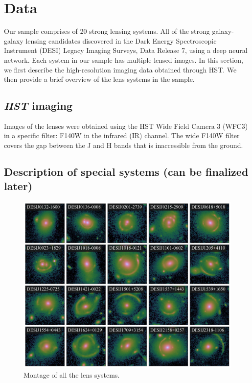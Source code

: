 \documentclass{aa}
\begin{document}
\section{Data} \label{sec:data}
Our sample comprises of 20 strong lensing systems. All of the strong galaxy-galaxy lensing candidates discovered in the Dark Energy Spectroscopic Instrument (DESI) Legacy Imaging Surveys, Data Release 7, using a deep neural network. Each system in our sample has multiple lensed images. In this section, we first describe the high-resolution imaging data obtained through HST. We then provide a brief overview of the lens systems in the sample.


\subsection{\textit{HST} imaging} 

Images of the lenses were obtained using the HST Wide Field Camera 3 (WFC3) in a specific filter: F140W in the infrared (IR) channel. The wide F140W filter covers the gap between the J and H bands that is inaccessible from the ground. 


\subsection{Description of special systems (can be finalized later)}


\begin{figure}
	\includegraphics[width=\textwidth]{figures/lens_montage.pdf}
	\caption{\label{fig:montage}
	Montage of all the lens systems.
	}
\end{figure}
\end{document}
